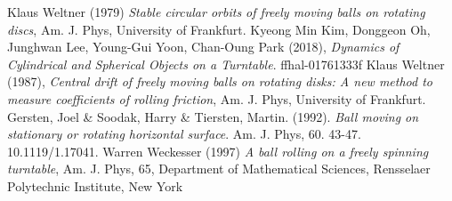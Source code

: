 \documentclass[a4paper,12pt]{article}
\begin{document}
	\begin{thebibliography}{9}
		Klaus Weltner (1979) \emph{Stable circular orbits of freely moving balls on rotating discs}, Am. J. Phys, University of Frankfurt.
		Kyeong Min Kim, Donggeon Oh, Junghwan Lee, Young-Gui Yoon, Chan-Oung Park (2018), \emph{Dynamics of Cylindrical and Spherical Objects on a Turntable}. ffhal-01761333f
		Klaus Weltner (1987), \emph{Central drift of freely moving balls on rotating disks: A new method to measure coefficients of rolling friction}, Am. J. Phys, University of Frankfurt.
		Gersten, Joel \& Soodak, Harry \& Tiersten, Martin. (1992). \emph{Ball moving on stationary or rotating horizontal surface}. Am. J. Phys, 60. 43-47. 10.1119/1.17041. 
		Warren Weckesser (1997) \emph{A ball rolling on a freely spinning turntable}, Am. J. Phys, 65, Department of Mathematical Sciences, Rensselaer Polytechnic Institute, New York
		
	\end{thebibliography}
\end{document}
